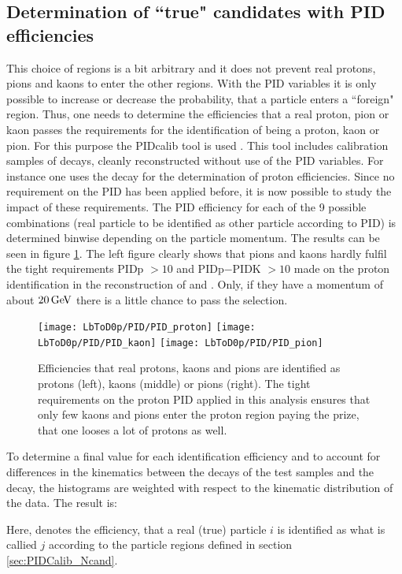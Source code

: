 \subsection{Determination of ``true" candidates with PID efficiencies}
This choice of regions is a bit arbitrary and it does not prevent real protons, pions and kaons to enter the other regions.
With the PID variables it is only possible to increase or decrease the probability, that a particle enters a ``foreign" region.
Thus, one needs to determine the efficiencies that a real proton, pion or kaon passes the requirements for the identification of being a proton, kaon or pion.
For this purpose the \lhcb PIDcalib tool is used \cite{PIDcalib}.
This tool includes calibration samples of decays, cleanly reconstructed without use of the PID variables. 
For instance one uses the decay \decay{\Lambda}{\proton\pim} for the determination of proton efficiencies.
Since no requirement on the PID has been applied before, it is now possible to study the impact of these requirements.
The PID efficiency for each of the 9 possible combinations (real particle to be identified as other particle according to PID) is determined binwise depending on the particle momentum. 
The results can be seen in figure \ref{fig:PIDefficiencies}.
The left figure clearly shows that pions and kaons hardly fulfil the tight requirements PIDp $>10$ and PIDp$-$PIDK $>10$ made on the proton identification in the reconstruction of \LbToDpmunuX and \LbToLcmunu.
Only, if they have a momentum of about $20 \mathrm{\,Ge\kern -0.1em V}$ there is a little chance to pass the selection.
\begin{figure}[tb]
	\centering
	\texttt{[image: LbToD0p/PID/PID\_proton]}
	\texttt{[image: LbToD0p/PID/PID\_kaon]}
	\texttt{[image: LbToD0p/PID/PID\_pion]}
	\caption{Efficiencies that real protons, kaons and pions are identified as protons (left), kaons (middle) or pions (right). The tight requirements on the proton PID applied in this analysis ensures that only few kaons and pions enter the proton region paying the prize, that one looses a lot of
    protons as well.}
	\label{fig:PIDefficiencies}
\end{figure}
To determine a final value for each identification efficiency and to account for differences in the kinematics between the decays of the test samples and the \LbToDpmunuX decay, the histograms are weighted with respect to the kinematic distribution of the \LbToDpmunuX data.
The result is:

Here,  denotes the efficiency, that a real (true) particle $i$ is identified as what is callied $j$ according to the particle regions defined in section \ref{sec:PIDCalib_Ncand}. 
